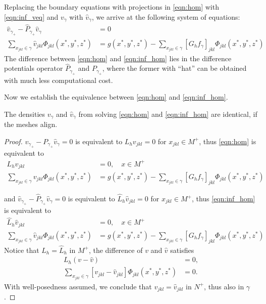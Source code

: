 Replacing the boundary equations with projections in \eqref{eqn:hom} with \eqref{eqn:inf_veq} and $v_\gamma$ with $\hat{v}_\gamma$, we arrive at the following system of equations:
\begin{subequations}\label{eqn:inf_hom}
\begin{align}
\hat{v}_{\gamma_+} - \widehat{P}_{\gamma_+} \hat{v}_\gamma &= 0\\
\sum_{x_{jkl}\in\gamma} \hat{v}_{jkl} \Phi_{jkl}(x^*,y^*,z^*) &= g(x^*,y^*,z^*)-\sum_{x_{jkl}\in\gamma}[G_hf_{\gamma}]_{jkl} \Phi_{jkl}(x^*,y^*,z^*)
\end{align}
\end{subequations}
The difference between \eqref{eqn:hom} and \eqref{eqn:inf_hom} lies in the difference potentials operator $\widehat{P}_{\gamma_+}$ and $P_{\gamma_+}$, where the former with ``hat'' can be obtained with much less computational cost.

Now we establish the equivalence between \eqref{eqn:hom} and \eqref{eqn:inf_hom}.

\begin{theorem}
The densities $v_\gamma$ and $\hat{v}_\gamma$ from solving \eqref{eqn:hom} and \eqref{eqn:inf_hom} are identical, if the meshes align.
\end{theorem}

\begin{proof}
$v_{\gamma_+} - P_{\gamma_+} \hat{v}_\gamma = 0$ is equivalent to $L_hv_{jkl}=0$ for $x_{jkl}\in M^+$, thus \eqref{eqn:hom} is equivalent to
\begin{subequations}
\begin{align}
L_hv_{jkl}&=0,\quad x\in M^+\\
\sum_{x_{jkl}\in\gamma} v_{jkl} \Phi_{jkl}(x^*,y^*,z^*) &= g(x^*,y^*,z^*)-\sum_{x_{jkl}\in\gamma}[G_hf_{\gamma}]_{jkl} \Phi_{jkl}(x^*,y^*,z^*)
\end{align}
\end{subequations}

and $\hat{v}_{\gamma_+} - \widehat{P}_{\gamma_+} \hat{v}_\gamma = 0$ is equivalent to  $\widehat{L}_h\hat{v}_{jkl}=0$ for $x_{jkl}\in M^+$, thus  \eqref{eqn:inf_hom} is equivalent to 
\begin{subequations}
\begin{align}
\widehat{L}_h\hat{v}_{jkl} &= 0,\quad x\in M^+\\
\sum_{x_{jkl}\in\gamma} \hat{v}_{jkl} \Phi_{jkl}(x^*,y^*,z^*) &= g(x^*,y^*,z^*)-\sum_{x_{jkl}\in\gamma}[G_hf_{\gamma}]_{jkl} \Phi_{jkl}(x^*,y^*,z^*)
\end{align}
\end{subequations}
Notice that $L_h=\widehat{L}_h$ in $M^+$, the difference of $v$ and $\hat{v}$ satisfies 
\begin{align}
L_h (v-\hat{v})&=0,\\
\sum_{x_{jkl}\in\gamma} [v_{jkl}-\hat{v}_{jkl}] \Phi_{jkl}(x^*,y^*,z^*) &=0.
\end{align}
With well-posedness assumed, we conclude that $v_{jkl}=\hat{v}_{jkl}$ in $N^+$, thus also in $\gamma$.
\end{proof}

